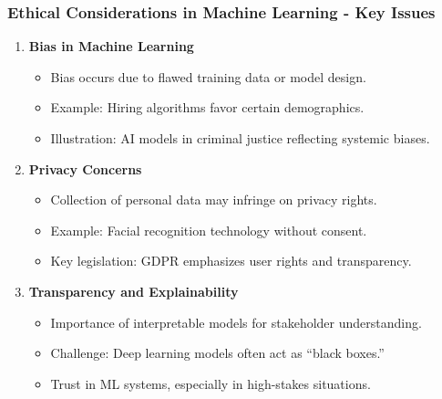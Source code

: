 \documentclass[aspectratio=169]{beamer}
\begin{document}
\begin{frame}[fragile]
    \frametitle{Ethical Considerations in Machine Learning - Key Issues}
    \begin{enumerate}
        \item \textbf{Bias in Machine Learning}
            \begin{itemize}
                \item Bias occurs due to flawed training data or model design.
                \item Example: Hiring algorithms favor certain demographics.
                \item Illustration: AI models in criminal justice reflecting systemic biases.
            \end{itemize}
        
        \item \textbf{Privacy Concerns}
            \begin{itemize}
                \item Collection of personal data may infringe on privacy rights.
                \item Example: Facial recognition technology without consent.
                \item Key legislation: GDPR emphasizes user rights and transparency.
            \end{itemize}
        
        \item \textbf{Transparency and Explainability}
            \begin{itemize}
                \item Importance of interpretable models for stakeholder understanding.
                \item Challenge: Deep learning models often act as ``black boxes.''
                \item Trust in ML systems, especially in high-stakes situations.
            \end{itemize}
    \end{enumerate}
\end{frame}
\end{document}

